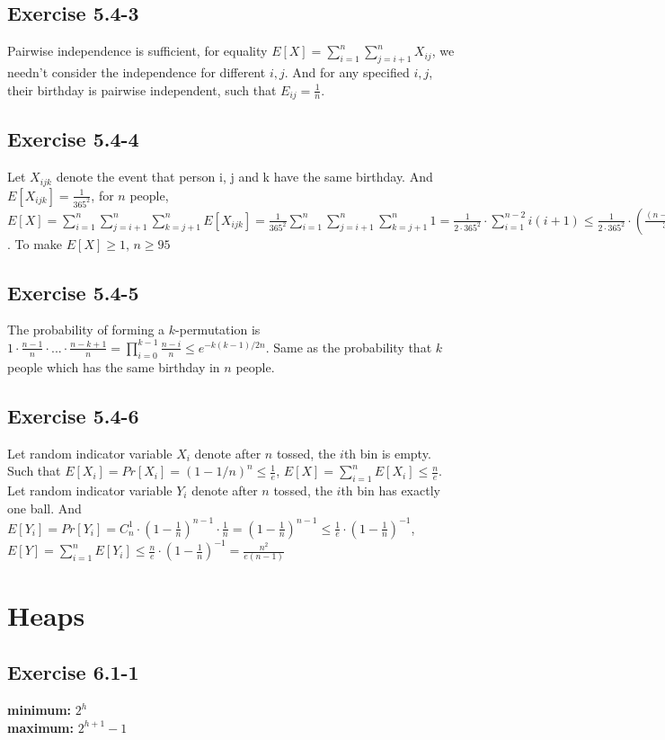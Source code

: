 \documentclass[12pt]{article}
\theoremstyle{definition}
\theoremstyle{remark}
\begin{document}
\subsection*{Exercise 5.4-3}
Pairwise independence is sufficient, for equality $E[X]=\sum\limits_{i=1}^{n}\sum\limits_{j=i+1}^{n}X_{ij}$, we needn't consider the independence for different $i,j$. And for any specified $i,j$, their birthday is pairwise independent, such that $E_{ij}=\frac{1}{n}$.
\subsection*{Exercise 5.4-4}
Let $X_{ijk}$ denote the event that person i, j and k have the same birthday. And $E[X_{ijk}]=\frac{1}{365^2}$, for $n$ people, $E[X]=\sum\limits_{i=1}^{n}\sum\limits_{j=i+1}^{n}\sum\limits_{k=j+1}^{n}E[X_{ijk}]=\frac{1}{365^2}\sum\limits_{i=1}^{n}\sum\limits_{j=i+1}^{n}\sum\limits_{k=j+1}^{n}1=\frac{1}{2\cdot365^2}\cdot\sum\limits_{i=1}^{n-2}i(i+1)\le\frac{1}{2\cdot365^2}\cdot(\frac{(n-2)^3}{3}-\frac{1}{3}+\frac{(n-1)(n-2)}{2})$. To make $E[X]\ge1$, $n\ge95$
\subsection*{Exercise 5.4-5}
The probability of forming a $k$-permutation is $1\cdot\frac{n-1}{n}\cdot...\cdot\frac{n-k+1}{n}=\prod\limits_{i=0}^{k-1}\frac{n-i}{n}\le e^{-k(k-1)/2n}$. Same as the probability that $k$ people which has the same birthday in $n$ people.
\subsection*{Exercise 5.4-6}
Let random indicator variable $X_i$ denote after $n$ tossed, the $i$th bin is empty. Such that $E[X_i]=Pr[X_i]=(1-1/n)^n\le\frac{1}{e}$, $E[X]=\sum\limits_{i=1}^nE[X_i]\le\frac{n}{e}$. Let random indicator variable $Y_i$ denote after $n$ tossed, the $i$th bin has exactly one ball. And $E[Y_i]=Pr[Y_i]=C_n^1\cdot(1-\frac{1}{n})^{n-1}\cdot\frac{1}{n}=(1-\frac{1}{n})^{n-1}\le\frac{1}{e}\cdot(1-\frac{1}{n})^{-1}$, $E[Y]=\sum\limits_{i=1}^nE[Y_i]\le\frac{n}{e}\cdot(1-\frac{1}{n})^{-1}=\frac{n^2}{e(n-1)}$
\section{Heaps}
\subsection*{Exercise 6.1-1}
\textbf{minimum:} $2^h$\\
\textbf{maximum:} $2^{h+1}-1$
\end{document}
